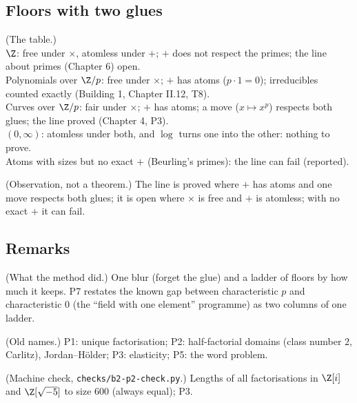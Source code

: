\subsection*{Floors with two glues}

\begin{lines}
\item[\lab{P6}] (The table.) \\
$\Z$: free under $\times$, atomless under $+$; $+$ does not respect the primes; the line about primes (Chapter 6) open. \\
Polynomials over $\Z/p$: free under $\times$; $+$ has atoms ($p \cdot 1 = 0$); irreducibles counted exactly (Building 1, Chapter II.12, T8). \\
Curves over $\Z/p$: fair under $\times$; $+$ has atoms; a move ($x \mapsto x^p$) respects both glues; the line proved (Chapter 4, P3). \\
$(0, \infty)$: atomless under both, and $\log$ turns one into the other: nothing to prove. \\
Atoms with sizes but no exact $+$ (Beurling's primes): the line can fail (reported).
\item[\lab{P7}] (Observation, not a theorem.) The line is proved where $+$ has atoms and one move respects both glues; it is open where $\times$ is free and $+$ is atomless; with no exact $+$ it can fail.
\end{lines}

\subsection*{Remarks}

\begin{lines}
\item[\lab{R1}] (What the method did.) One blur (forget the glue) and a ladder of floors by how much it keeps. P7 restates the known gap between characteristic $p$ and characteristic $0$ (the ``field with one element'' programme) as two columns of one ladder.
\item[\lab{R2}] (Old names.) P1: unique factorisation; P2: half-factorial domains (class number $2$, Carlitz), Jordan--H\"older; P3: elasticity; P5: the word problem.
\item[\lab{R3}] (Machine check, \texttt{checks/b2-p2-check.py}.) Lengths of all factorisations in $\Z[i]$ and $\Z[\sqrt{-5}]$ to size $600$ (always equal); P3.
\end{lines}

\newpage

